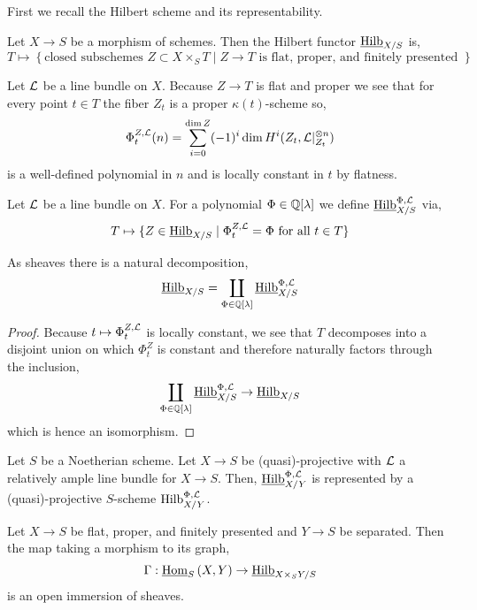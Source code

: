\documentclass[12pt]{article}
\newcommand{\uHilb}{\underline{\Hilb}}
\newcommand{\uHom}[3]{\underline{\mathrm{Hom}}_{#1}\left(#2, #3\right)}
\begin{document}
\begin{rmk}
First we recall the Hilbert scheme and its representability. 
\end{rmk}

\begin{defn}
Let $X \to S$ be a morphism of schemes. Then the Hilbert functor $\underline{\mathrm{Hilb}}_{X/S}$ is,
\[ T \mapsto \left\{ \text{closed subschemes } Z \subset X \times_S T \mid Z \to T \text{ is flat, proper, and finitely presented } \right\} \]
\end{defn}

\begin{rmk}
Let $\mathcal{L}$ be a line bundle on $X$.
Because $Z \to T$ is flat and proper we see that for every point $t \in T$ the fiber $Z_t$ is a proper $\kappa(t)$-scheme so,
\[ \Phi_{t}^{Z, \mathcal{L}}(n) = \sum_{i = 0}^{\dim{Z}} (-1)^i \dim H^i(Z_t, \mathcal{L}|_{Z_t}^{\otimes n}) \]
is a well-defined polynomial in $n$ and  is locally constant in $t$ by flatness.
\end{rmk}

\begin{defn}
Let $\mathcal{L}$ be a line bundle on $X$. For a polynomial $\Phi \in \mathbb{Q}[\lambda]$ we define $\underline{\mathrm{Hilb}}^{\Phi, \mathcal{L}}_{X/S}$ via,
\[ T \mapsto \{ Z \in \underline{\mathrm{Hilb}}_{X/S} \mid \Phi_{t}^{Z, \mathcal{L}} = \Phi \text{ for all } t \in T \} \]
\end{defn}

\begin{prop}
As sheaves there is a natural decomposition,
\[ \uHilb_{X/S} = \coprod_{\Phi \in \Q[\lambda]} \uHilb^{\Phi, \L}_{X/S} \]
\end{prop}

\begin{proof}
Because $t \mapsto \Phi_t^{Z, \mathcal{L}}$ is locally constant, we see that $T$ decomposes into a disjoint union on which $\Phi_t^Z$ is constant and therefore naturally factors through the inclusion,
\[ \coprod_{\Phi \in \Q[\lambda]} \uHilb^{\Phi, \L}_{X/S} \to \uHilb_{X/S} \]
which is hence an isomorphism. 
\end{proof}

\begin{thm}[Grothendieck]
Let $S$ be a Noetherian scheme. Let $X \to S$ be (quasi)-projective with $\mathcal{L}$ a relatively ample line bundle for $X \to S$. Then, $\uHilb_{X/Y}^{\Phi, \L}$ is represented by a (quasi)-projective $S$-scheme $\mathrm{Hilb}_{X/Y}^{\Phi, \mathcal{L}}$.
\end{thm}

\begin{prop}
Let $X \to S$ be flat, proper, and finitely presented and $Y \to S$ be separated. Then the map taking a morphism to its graph, 
\[ \Gamma : \uHom{S}{X}{Y} \to \uHilb_{X \times_S Y /S} \]
is an open immersion of sheaves.
\end{prop}
\end{document}
